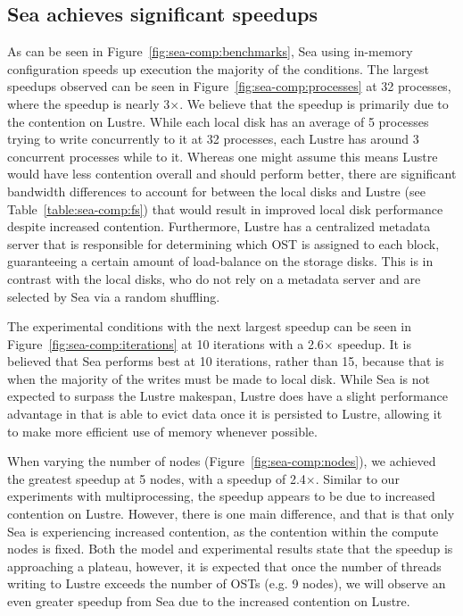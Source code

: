 \documentclass[10pt,journal,compsoc]{IEEEtran}
\begin{document}
      \subsection{Sea achieves significant speedups}

      As can be seen in Figure~\ref{fig:sea-comp:benchmarks}, Sea using
      in-memory configuration speeds up execution the majority of the
      conditions. The largest speedups observed can be seen in
      Figure~\ref{fig:sea-comp:processes} at 32 processes, where the speedup is
      nearly 3$\times$. We believe that the speedup is primarily due to the
      contention on Lustre. While each local disk has an average of 5 processes
      trying to write concurrently to it at 32 processes, each Lustre has around
      3 concurrent processes while to it. Whereas one might assume this means
      Lustre would have less contention overall and should perform better, there
      are significant bandwidth differences to account for between the local
      disks and Lustre (see Table~\ref{table:sea-comp:fs}) that would result in
      improved local disk performance despite increased contention. Furthermore,
      Lustre has a centralized metadata server that is responsible for
      determining which OST is assigned to each block, guaranteeing a certain
      amount of load-balance on the storage disks. This is in contrast with the
      local disks, who do not rely on a metadata server and are selected by Sea
      via a random shuffling.

      The experimental conditions with the next largest speedup can be seen in
      Figure~\ref{fig:sea-comp:iterations} at 10 iterations with a 2.6$\times$
      speedup. It is believed that Sea performs best at 10 iterations, rather
      than 15, because that is when the majority of the writes must be made to
      local disk. While Sea is not expected to surpass the Lustre makespan,
      Lustre does have a slight performance advantage in that is able to evict
      data once it is persisted to Lustre, allowing it to make more efficient
      use of memory whenever possible. 

      When varying the number of nodes (Figure~\ref{fig:sea-comp:nodes}), we
      achieved the greatest speedup at 5 nodes, with a speedup of 2.4$\times$.
      Similar to our experiments with multiprocessing, the speedup appears
      to be due to increased contention on Lustre. However, there is one main
      difference, and that is that only Sea is experiencing increased
      contention, as the contention within the compute nodes is fixed. Both the
      model and experimental results state that the speedup is approaching a
      plateau, however, it is expected that once the number of threads writing
      to Lustre exceeds the number of OSTs (e.g. 9 nodes), we will observe an
      even greater speedup from Sea due to the increased contention on Lustre.
\end{document}
